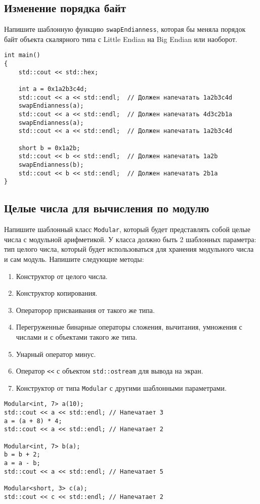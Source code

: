 \documentclass{article}
\begin{document}
\newpage
\subsection{Изменение порядка байт}
Напишите шаблонную функцию \texttt{swapEndianness}, которая бы меняла порядок байт объекта скалярного типа с Little Endian на Big Endian или наоборот.
\begin{lstlisting}
int main()
{
    std::cout << std::hex;
    
    int a = 0x1a2b3c4d; 
    std::cout << a << std::endl;  // Должен напечатать 1a2b3c4d
    swapEndianness(a);             
    std::cout << a << std::endl;  // Должен напечатать 4d3c2b1a
    swapEndianness(a);             
    std::cout << a << std::endl;  // Должен напечатать 1a2b3c4d
    
    short b = 0x1a2b;   
    std::cout << b << std::endl;  // Должен напечатать 1a2b
    swapEndianness(b);
    std::cout << b << std::endl;  // Должен напечатать 2b1a
}
\end{lstlisting}


\subsection{Целые числа для вычисления по модулю}
Напишите шаблонный класс \texttt{Modular}, который будет представлять собой целые числа с модульной арифметикой. У класса должно быть 2 шаблонных параметра: тип целого числа, который будет использоваться для хранения модульного числа и сам модуль. Напишите следующие методы:
\begin{enumerate}
\item Конструктор от целого числа.
\item Конструктор копирования.
\item Операторор присваивания от такого же типа.
\item Перегруженные бинарные операторы сложения, вычитания, умножения с числами и с объектами такого же типа.
\item Унарный оператор минус.
\item Оператор \texttt{<{}<} с объектом \texttt{std::ostream} для вывода на экран.
\item Конструктор от типа \texttt{Modular} с другими шаблонными параметрами.
\end{enumerate}
\begin{lstlisting}
Modular<int, 7> a(10);
std::cout << a << std::endl; // Напечатает 3
a = (a + 8) * 4;
std::cout << a << std::endl; // Напечатает 2

Modular<int, 7> b(a);
b = b + 2;
a = a - b;
std::cout << a << std::endl; // Напечатает 5

Modular<short, 3> с(a);
std::cout << c << std::endl; // Напечатает 2
\end{lstlisting}
\end{document}
